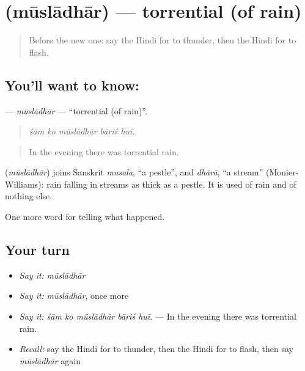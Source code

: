 \section[\texorpdfstring{\hi{मूसलाधार} (mūslādhār)}{मूसलाधार (mūslādhār)}]{ (mūslādhār) — torrential (of rain)}

\label{lesson:HI-C304-musladhar}



\begin{quote}
Before the new one: say the Hindi for to thunder, then the Hindi for to flash.
\end{quote}

\subsection*{You'll want to know: }
\textbf{} — \emph{mūslādhār} — \textquotedblleft{}torrential (of rain)\textquotedblright{}.

\begin{quote}
    
\end{quote}

\begin{quote}
\emph{śām ko mūslādhār bāriś huī.}
\end{quote}

\begin{quote}
In the evening there was torrential rain.
\end{quote}

\begin{cousinweb}
\textbf{} (\emph{mūslādhār}) joins Sanskrit \emph{musala}, \textquotedblleft{}a pestle\textquotedblright{}, and \emph{dhārā}, \textquotedblleft{}a stream\textquotedblright{} (Monier-Williams): rain falling in streams as thick as a pestle. It is used of rain and of nothing else.
\end{cousinweb}

\begin{grammarlens}[title={What you've built}]
One more word for telling what happened.
\end{grammarlens}

\subsection*{Your turn}
\begin{itemize}
\raggedright
  \item \emph{Say it:} \emph{mūslādhār}
  \item \emph{Say it:} \emph{mūslādhār}, once more
  \item \emph{Say it:} \emph{śām ko mūslādhār bāriś huī.} — In the evening there was torrential rain.
  \item \emph{Recall:} say the Hindi for to thunder, then the Hindi for to flash, then say \emph{mūslādhār} again
\end{itemize}

